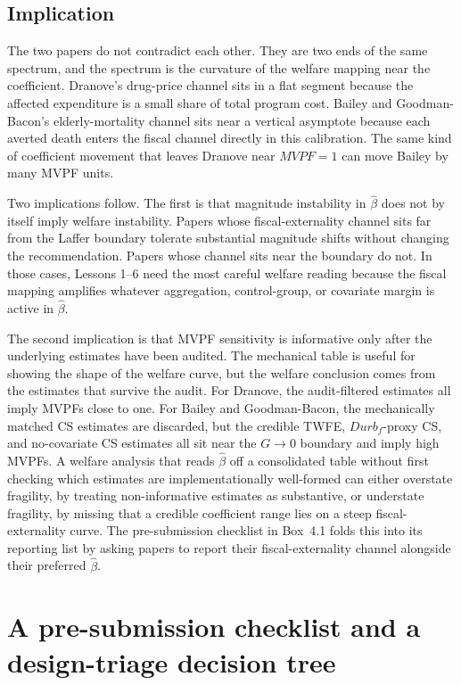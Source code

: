 \subsection{Implication}

The two papers do not contradict each other. They are two ends of the same spectrum, and the spectrum is the curvature of the welfare mapping near the coefficient. Dranove's drug-price channel sits in a flat segment because the affected expenditure is a small share of total program cost. Bailey and Goodman-Bacon's elderly-mortality channel sits near a vertical asymptote because each averted death enters the fiscal channel directly in this calibration. The same kind of coefficient movement that leaves Dranove near \(MVPF=1\) can move Bailey by many MVPF units.

Two implications follow. The first is that magnitude instability in \(\hat\beta\) does not by itself imply welfare instability. Papers whose fiscal-externality channel sits far from the Laffer boundary tolerate substantial magnitude shifts without changing the recommendation. Papers whose channel sits near the boundary do not. In those cases, Lessons 1--6 need the most careful welfare reading because the fiscal mapping amplifies whatever aggregation, control-group, or covariate margin is active in \(\hat\beta\).

The second implication is that MVPF sensitivity is informative only after the underlying estimates have been audited. The mechanical table is useful for showing the shape of the welfare curve, but the welfare conclusion comes from the estimates that survive the audit. For Dranove, the audit-filtered estimates all imply MVPFs close to one. For Bailey and Goodman-Bacon, the mechanically matched CS estimates are discarded, but the credible TWFE, \(Durb_f\)-proxy CS, and no-covariate CS estimates all sit near the \(G\to0\) boundary and imply high MVPFs. A welfare analysis that reads \(\hat\beta\) off a consolidated table without first checking which estimates are implementationally well-formed can either overstate fragility, by treating non-informative estimates as substantive, or understate fragility, by missing that a credible coefficient range lies on a steep fiscal-externality curve. The pre-submission checklist in Box~4.1 folds this into its reporting list by asking papers to report their fiscal-externality channel alongside their preferred \(\hat\beta\).



\newpage
\section{A pre-submission checklist and a design-triage decision tree}
\label{sec:applied_guide}

